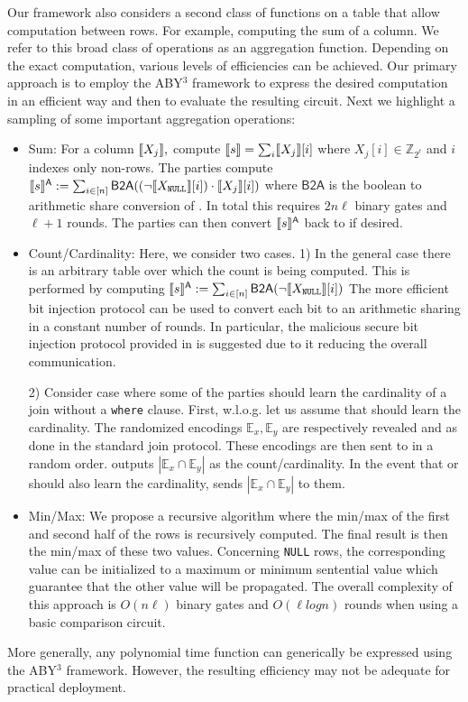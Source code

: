 Our framework also considers a second class of functions on a table that allow computation between rows. For example, computing the sum of a column. We refer to this broad class of operations as an aggregation function. Depending on the exact computation, various levels of efficiencies can be achieved. Our primary approach is to employ the ABY$^3$ framework \cite{aby3} to express the desired computation in an efficient way and then to evaluate the resulting circuit. Next we highlight a sampling of some important aggregation operations:
\begin{itemize}
	\item Sum: For a column $\llbracket X_j\rrbracket,$ compute $\llbracket s\rrbracket=\sum_i \llbracket X_j\rrbracket[i]$ where $X_j[i]\in \mathbb{Z}_{2^\ell}$ and $i$ indexes only non-\Null rows. The parties compute $\llbracket s\rrbracket^{\textsf{A}}:=\sum_{i\in [n]}\textsf{B2A}((\neg\llbracket X_\texttt{NULL}\rrbracket[i]) \cdot \llbracket X_j\rrbracket[i])$ where $\textsf{B2A}$ is the boolean to arithmetic share conversion of \cite{aby3}. In total this requires $2n\ell$ binary gates and $\ell+1$ rounds\cite{aby3}. The parties can then convert $\llbracket s\rrbracket^{\textsf{A}}$ back to  if desired. %
	
	\item Count/Cardinality: Here, we consider two cases. 1) In the general case there is an arbitrary table over which the count is being computed. This is performed by computing $\llbracket s\rrbracket^{\textsf{A}}:=\sum_{i\in [n]}\textsf{B2A}(\neg\llbracket X_\texttt{NULL}\rrbracket[i])$ 
	\iffullversion 
	The more efficient bit injection protocol\cite{aby3} can be used to convert each bit to an arithmetic sharing in a constant number of rounds. In particular, the malicious secure bit injection protocol provided in \cite{aby3} is suggested due to it reducing the overall communication. 
	\fi
	
	2) Consider case where some of the parties should learn the cardinality of a join without a \texttt{where} clause. %
	First, w.l.o.g. let us assume that  should learn the cardinality. The randomized encodings $\mathbb{E}_x,\mathbb{E}_y$ are respectively revealed  and   as done in the standard join protocol. These encodings are then sent to  in a random order.  outputs $|\mathbb{E}_x \cap \mathbb{E}_y|$ as the count/cardinality. In the event that  or  should also learn the cardinality,  sends $|\mathbb{E}_x \cap \mathbb{E}_y|$ to them.
	
	\item  Min/Max: We propose a recursive algorithm where the min/max of the first and second half of the rows is recursively computed. The final result is then the min/max of these two values.  Concerning \texttt{NULL} rows, the corresponding value can be initialized to a maximum or minimum sentential value which guarantee that the other value will be propagated. The overall complexity of this approach is $O(n\ell)$ binary gates and $O(\ell log n)$ rounds when using a basic comparison circuit\cite{aby3}.
\end{itemize}

More generally, any polynomial time function can generically be expressed using the ABY$^3$ framework\cite{aby3}. However, the resulting efficiency may not be adequate for practical deployment.  

